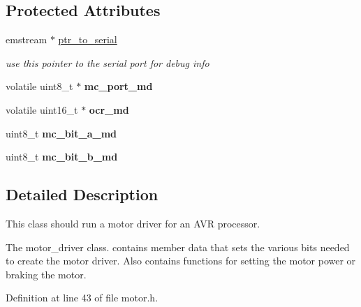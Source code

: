 \subsection*{\-Protected \-Attributes}
\begin{DoxyCompactItemize}
\item 
\hypertarget{classmotor_a618a4f3836e6d7e204469f38a6036d6f}{emstream $\ast$ \hyperlink{classmotor_a618a4f3836e6d7e204469f38a6036d6f}{ptr\-\_\-to\-\_\-serial}}\label{classmotor_a618a4f3836e6d7e204469f38a6036d6f}

\begin{DoxyCompactList}\small\item\em use this pointer to the serial port for debug info \end{DoxyCompactList}\item 
\hypertarget{classmotor_a0e87c86a28b613f1b1888103d2dfe716}{volatile uint8\-\_\-t $\ast$ {\bfseries mc\-\_\-port\-\_\-md}}\label{classmotor_a0e87c86a28b613f1b1888103d2dfe716}

\item 
\hypertarget{classmotor_afc7500a2e5925ad1326b1bfd7dc845b2}{volatile uint16\-\_\-t $\ast$ {\bfseries ocr\-\_\-md}}\label{classmotor_afc7500a2e5925ad1326b1bfd7dc845b2}

\item 
\hypertarget{classmotor_a76a903d8d805d8a27af73a4ce543fe40}{uint8\-\_\-t {\bfseries mc\-\_\-bit\-\_\-a\-\_\-md}}\label{classmotor_a76a903d8d805d8a27af73a4ce543fe40}

\item 
\hypertarget{classmotor_ad57ef698e3ba68c45a2318af2f7151bc}{uint8\-\_\-t {\bfseries mc\-\_\-bit\-\_\-b\-\_\-md}}\label{classmotor_ad57ef698e3ba68c45a2318af2f7151bc}

\end{DoxyCompactItemize}


\subsection{\-Detailed \-Description}
\-This class should run a motor driver for an \-A\-V\-R processor. 

\-The motor\-\_\-driver class. contains member data that sets the various bits needed to create the motor driver. \-Also contains functions for setting the motor power or braking the motor. 

\-Definition at line 43 of file motor.\-h.



